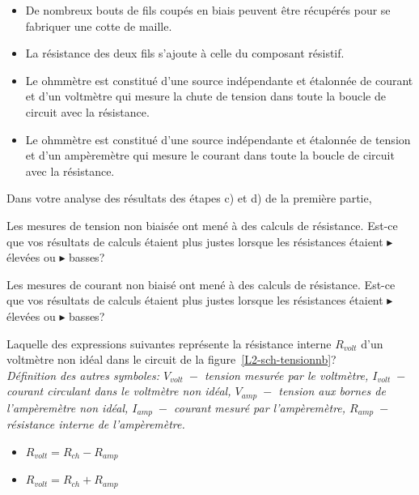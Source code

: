 \documentclass[canadien,12pt,oneside,letterpaper]{article}
\begin{document}
\begin{gradescope}
\begin{gradescope}
\begin{itemize}[label=$\blacktriangleright$]
        \item De nombreux bouts de fils coupés en biais peuvent être récupérés pour se fabriquer une cotte de maille.
        \item La résistance des deux fils s'ajoute à celle du composant résistif.
        \item Le ohmmètre est constitué d'une source indépendante et étalonnée de courant et d'un voltmètre qui mesure la chute de tension dans toute la boucle de circuit avec la résistance.
        \item Le ohmmètre est constitué d'une source indépendante et étalonnée de tension et d'un ampèremètre qui mesure le courant dans toute la boucle de circuit avec la résistance.  
        \end{itemize}
    \end{gradescope}
\item Dans votre analyse des résultats des étapes c) et d) de la première partie, 
    \begin{gradescope}
    \item Les mesures de tension non biaisée ont mené à des calculs de résistance. Est-ce que vos résultats de calculs étaient plus justes lorsque les résistances étaient $\blacktriangleright$ élevées ou $\blacktriangleright$ basses? 
    \item Les mesures de courant non biaisé ont mené à des calculs de résistance. Est-ce que vos résultats de calculs étaient plus justes lorsque les résistances étaient $\blacktriangleright$ élevées ou $\blacktriangleright$ basses? 
    \item Laquelle des expressions suivantes représente la résistance interne $R_{volt}$ d'un voltmètre non idéal dans le circuit de la figure~\ref{L2-sch-tensionnb}?\\ \textit{\footnotesize Définition des autres symboles: $V_{volt}\;-$ tension mesurée par le voltmètre, $I_{volt}\;- $ courant circulant dans le voltmètre non idéal, $V_{amp}\;-$ tension aux bornes de l'ampèremètre non idéal, $I_{amp}\;- $ courant mesuré par l'ampèremètre, $R_{amp}\;- $ résistance interne de l'ampèremètre.} 
    \begin{itemize}[label=$\blacktriangleright$]
    \item $R_{volt}=R_{ch}-R_{amp}$
    \item $R_{volt}=R_{ch}+R_{amp}$

\end{itemize}
\end{gradescope}
\end{gradescope}
\end{document}
